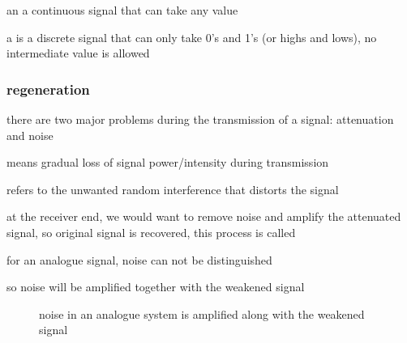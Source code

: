 \rcyskip

\begin{ilight}
	an   a continuous signal that can take any value
\end{ilight}

\begin{ilight}	
	a  is a discrete signal that can only take 0's and 1's (or highs and lows), no intermediate value is allowed
\end{ilight}



\subsubsection{regeneration}

there are two major problems during the transmission of a signal: attenuation and noise

\begin{ilight}
	 means gradual loss of signal power/intensity during transmission
\end{ilight}

\begin{ilight}
	 refers to the unwanted random interference that distorts the signal
\end{ilight}

at the receiver end, we would want to remove noise and amplify the attenuated signal, so original signal is recovered, this process is called 


\cmt for an analogue signal, noise can not be distinguished

so noise will be amplified together with the weakened signal

\begin{figure}[ht]
	\centering
	
	\caption*{noise in an analogue system is amplified along with the weakened signal}
\end{figure}

